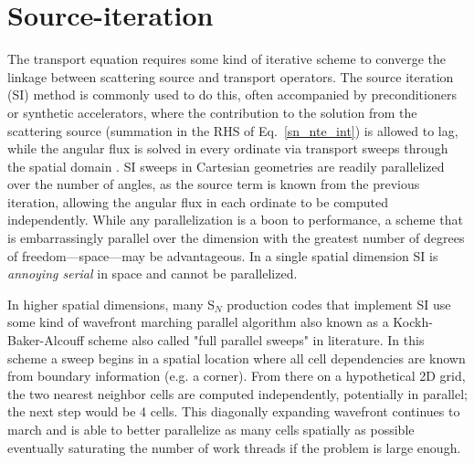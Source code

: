 \section{Source-iteration}
\label{sec:intro_itterative-scheme}

The transport equation requires some kind of iterative scheme to converge the linkage between scattering source and transport operators.
The source iteration (SI) method is commonly used to do this, often accompanied by preconditioners or synthetic accelerators, where the contribution to the solution from the scattering source (summation in the RHS of Eq.~\eqref{sn_nte_int}) is allowed to lag, while the angular flux is solved in every ordinate via transport sweeps through the spatial domain \cite{adams_subcell_1997}.
SI sweeps in Cartesian geometries are readily parallelized over the number of angles, as the source term is known from the previous iteration, allowing the angular flux in each ordinate to be computed independently. 
While any parallelization is a boon to performance, a scheme that is embarrassingly parallel over the dimension with the greatest number of degrees of freedom---space---may be advantageous.
In a single spatial dimension SI is \textit{annoying serial} in space and cannot be parallelized.

In higher spatial dimensions, many S$_N$ production codes that implement SI use some kind of wavefront marching parallel algorithm also known as a Kockh-Baker-Alcouff scheme \cite{baker_kba_2017, colomer_parallel_2013} also called "full parallel sweeps" in literature.
In this scheme a sweep begins in a spatial location where all cell dependencies are known from boundary information (e.g. a corner).
From there on a hypothetical 2D grid, the two nearest neighbor cells are computed independently, potentially in parallel; the next step would be 4 cells.
This diagonally expanding wavefront continues to march and is able to better parallelize as many cells spatially as possible eventually saturating the number of work threads if the problem is large enough.

